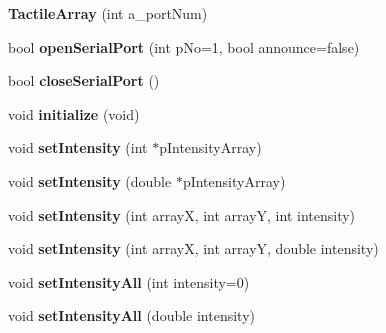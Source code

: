 \begin{DoxyCompactItemize}
\item 
\hypertarget{classTactileArray_acbfafee94d72b978ace17f08167fc036}{
{\bfseries TactileArray} (int a\_\-portNum)}
\label{classTactileArray_acbfafee94d72b978ace17f08167fc036}

\item 
\hypertarget{classTactileArray_aeadf3a68daab9c158a108a15debb28b8}{
bool {\bfseries openSerialPort} (int pNo=1, bool announce=false)}
\label{classTactileArray_aeadf3a68daab9c158a108a15debb28b8}

\item 
\hypertarget{classTactileArray_a3dd4969a067bd024a98fa9e99e40e971}{
bool {\bfseries closeSerialPort} ()}
\label{classTactileArray_a3dd4969a067bd024a98fa9e99e40e971}

\item 
\hypertarget{classTactileArray_ad8d01bfeb199b58617a5f5a8797c078e}{
void {\bfseries initialize} (void)}
\label{classTactileArray_ad8d01bfeb199b58617a5f5a8797c078e}

\item 
\hypertarget{classTactileArray_a62f715d4171c021a1d22ae67b2cb121d}{
void {\bfseries setIntensity} (int $\ast$pIntensityArray)}
\label{classTactileArray_a62f715d4171c021a1d22ae67b2cb121d}

\item 
\hypertarget{classTactileArray_a9d537a2423b2cba35badcca3468593f0}{
void {\bfseries setIntensity} (double $\ast$pIntensityArray)}
\label{classTactileArray_a9d537a2423b2cba35badcca3468593f0}

\item 
\hypertarget{classTactileArray_a57f15c2bbd18cbbdf2fe59d8a550d8a5}{
void {\bfseries setIntensity} (int arrayX, int arrayY, int intensity)}
\label{classTactileArray_a57f15c2bbd18cbbdf2fe59d8a550d8a5}

\item 
\hypertarget{classTactileArray_a8e84527dac8a4b36ac8dbddf50a4c855}{
void {\bfseries setIntensity} (int arrayX, int arrayY, double intensity)}
\label{classTactileArray_a8e84527dac8a4b36ac8dbddf50a4c855}

\item 
\hypertarget{classTactileArray_abbca9d69c0c6be1816214ebb75ecd16c}{
void {\bfseries setIntensityAll} (int intensity=0)}
\label{classTactileArray_abbca9d69c0c6be1816214ebb75ecd16c}

\item 
\hypertarget{classTactileArray_ad3edd3dc58c199e73a5095fe9ccb6c5e}{
void {\bfseries setIntensityAll} (double intensity)}
\label{classTactileArray_ad3edd3dc58c199e73a5095fe9ccb6c5e}


\end{DoxyCompactItemize}
